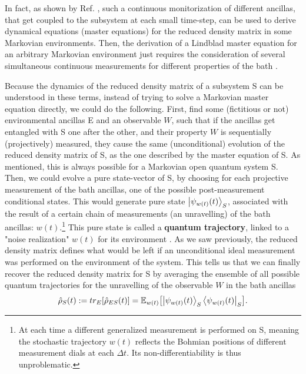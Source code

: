 \documentclass[11pt, a4paper]{article} %
\begin{document}
In fact, as shown by Ref. \cite{continousMeas}, such a continuous monitorization of different ancillas, that get coupled to the subsystem at each small time-step, can be used to derive dynamical equations (master equations) for the reduced density matrix in some Markovian environments. Then, the derivation of a Lindblad master equation \cite{Generalized, MarkovianityDefs} for an arbitrary Markovian environment just requires the consideration of several simultaneous continuous measurements for different properties of the bath \cite{continousMeas, MarkovianityDefs}.

Because the dynamics of the reduced density matrix of a subsystem S can be understood in these terms, instead of trying to solve a Markovian master equation directly, we could do the following. First, find some (fictitious or not) environmental ancillas E and an observable $W$, such that if the ancillas get entangled with S one after the other, and their property $W$ is sequentially (projectively) measured, they cause the same (unconditional) evolution of the reduced density matrix of S, as the one described by the master equation of S. As mentioned, this is always possible for a Markovian open quantum system S. Then, we could evolve a pure state-vector of S, by choosing for each projective measurement of the bath ancillas, one of the possible post-measurement conditional states. This would generate pure state $\ket{\psi_{w(t)}(t)}_S$, associated with the result of a certain chain of measurements (an unravelling) of the bath ancillas: $w(t)$.\footnote{At each time a different generalized measurement is performed on S, meaning the stochastic trajectory $w(t)$ reflects the Bohmian positions of different measurement dials at each $\Delta t$. Its non-differentiability is thus unproblematic.} This pure state is called a {\bf quantum trajectory}, linked to a "noise realization" $w(t)$ for its environment \cite{Generalized, MarkovianityDefs, QuantumTrajs}. As we saw previously, the reduced density matrix defines what would be left if an unconditional ideal measurement was performed on the environment of the system. This tells us that we can finally recover the reduced density matrix for S by averaging the ensemble of all possible quantum trajectories for the unravelling of the observable $W$ in the bath ancillas \cite{MarkovianityDefs,QuantumTrajs}\vspace{-0.17cm}
\begin{equation}
\hat{\rho}_S(t):=tr_{E}[\hat{\rho}_{ES}(t)]=\mathbb{E}_{w(t)}\qty[\ket{\psi_{w(t)}(t)}_S\bra{\psi_{w(t)}(t)}_S]. \vspace{-0.07cm}
\end{equation}
\end{document}
